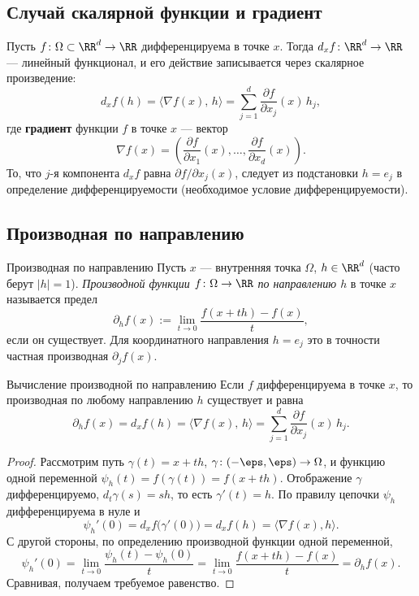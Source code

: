 \subsection*{Случай скалярной функции и градиент}

Пусть $f\colon\Omega\subset\RR^d\to\RR$ дифференцируема в точке $x$. Тогда
$d_xf\colon\RR^d\to\RR$ --- линейный функционал, и его действие записывается через
скалярное произведение:
\[
d_xf(h)=\langle\nabla f(x),\,h\rangle=\sum_{j=1}^{d}\frac{\partial f}{\partial x_j}(x)\,h_j,
\]
где \textbf{градиент} функции $f$ в точке $x$ --- вектор
\[
\nabla f(x)=
\left(
\frac{\partial f}{\partial x_1}(x),
\dots,
\frac{\partial f}{\partial x_d}(x)
\right).
\]
То, что $j$-я компонента $d_xf$ равна $\partial f/\partial x_j(x)$, следует из подстановки
$h=e_j$ в определение дифференцируемости (необходимое условие дифференцируемости).

\subsection*{Производная по направлению}

\begin{Definition}{Производная по направлению}{}
	Пусть $x$ --- внутренняя точка $\Omega$, $h\in\RR^d$ (часто берут $|h|=1$).
	\emph{Производной функции $f\colon\Omega\to\RR$ по направлению $h$} в точке $x$
	называется предел
	\[
	\partial_h f(x):=\lim_{t\to 0}\frac{f(x+th)-f(x)}{t},
	\]
	если он существует. Для координатного направления $h=e_j$ это в точности частная
	производная $\partial_j f(x)$.
\end{Definition}

\begin{Statement}{Вычисление производной по направлению}{}
	Если $f$ дифференцируема в точке $x$, то производная по любому направлению $h$
	существует и равна
	\[
	\partial_h f(x)=d_xf(h)=\langle\nabla f(x),\,h\rangle=\sum_{j=1}^{d}\frac{\partial f}{\partial x_j}(x)\,h_j.
	\]
\end{Statement}

\begin{proof}
	Рассмотрим путь $\gamma(t)=x+th$, $\gamma\colon(-\eps,\eps)\to\Omega$, и функцию
	одной переменной $\psi_h(t)=f(\gamma(t))=f(x+th)$. Отображение $\gamma$
	дифференцируемо, $d_t\gamma(s)=sh$, то есть $\gamma'(t)=h$. По правилу цепочки
	$\psi_h$ дифференцируема в нуле и
	\[
	\psi_h'(0)=d_xf\bigl(\gamma'(0)\bigr)=d_xf(h)=\langle\nabla f(x),h\rangle.
	\]
	С другой стороны, по определению производной функции одной переменной,
	\[
	\psi_h'(0)=\lim_{t\to0}\frac{\psi_h(t)-\psi_h(0)}{t}
	=\lim_{t\to0}\frac{f(x+th)-f(x)}{t}=\partial_h f(x).
	\]
	Сравнивая, получаем требуемое равенство.
\end{proof}

